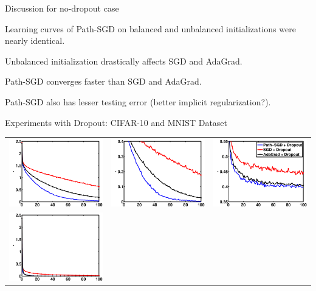 \documentclass[presentation,xcolor={usenames,dvipsnames},10pt]{beamer}
\newcommand{\RSGD}{Path-SGD }
\begin{document}
\begin{frame}{Discussion for no-dropout case}
	\bit 
	\item Learning curves of \RSGD on balanced and unbalanced initializations were nearly identical.  
	
	\item Unbalanced initialization drastically affects SGD and AdaGrad. 
	
	\item \RSGD converges faster than SGD and AdaGrad. 
	
	\item \RSGD also has lesser testing error (better implicit regularization?). 
	
	\eit 
\end{frame}

\begin{frame}{Experiments with Dropout: CIFAR-10 and MNIST Dataset}
	\centering
	\begin{tabular}{ccc}
		\includegraphics[width=0.33\linewidth]{drop-cifar10-surr.pdf} &
		\includegraphics[width=0.33\linewidth]{drop-cifar10-train.pdf} &
		\includegraphics[width=0.33\linewidth]{drop-cifar10-test.pdf} \\
		\includegraphics[width=0.33\linewidth]{drop-mnist-surr.pdf} &

\end{tabular}
\end{frame}
\end{document}

